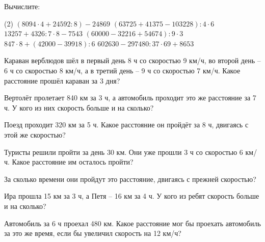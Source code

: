 %

\begin{class}[number=1]
	\begin{listofex}
		\item Вычислите:
		\begin{tasks}(2)
			\task \( ( 8 094 \cdot 4 + 24 592 : 8 ) - 24 869\)
			\task \( ( 63 725 + 41 375 - 103 228 ) : 4 \cdot 6 \)
			\task \( 13 257 + 4 326 : 7 \cdot 8 - 7 543 \)
			\task \( ( 60 000 - 32 216 + 54 674 ) : 9 \cdot 3 \)
			\task \( 847 \cdot 8 + ( 42 000 - 39 918) : 6 \)
			\task \( 602 630 - 297 480 : 37 \cdot 69 + 8 653 \)
		\end{tasks}
		\item Караван верблюдов шёл в первый день 8 ч со скоростью 9 км/ч, во второй день – 6 ч со скоростью 8 км/ч, а в третий день – 9 ч со скоростью 7 км/ч. Какое расстояние прошёл караван за 3 дня?
		\item Вертолёт пролетает 840 км за 3 ч, а автомобиль проходит это же расстояние за 7 ч. У кого из них скорость больше и на сколько?
		\item Поезд проходит 320 км за 5 ч. Какое расстояние он пройдёт за 8 ч, двигаясь с этой же скоростью?
		\item Туристы решили пройти за день 30 км. Они уже прошли 3 ч со скоростью 6 км/ч. Какое расстояние им осталось пройти?
		\item За сколько времени они пройдут это расстояние, двигаясь с прежней скоростью?
		\item Ира прошла 15 км за 3 ч, а Петя – 16 км за 4 ч. У кого из ребят скорость больше и на сколько?
		\item Автомобиль за 6 ч проехал 480 км. Какое расстояние мог бы проехать автомобиль за это же время, если бы увеличил скорость на 12 км/ч?
	\end{listofex}
\end{class}

